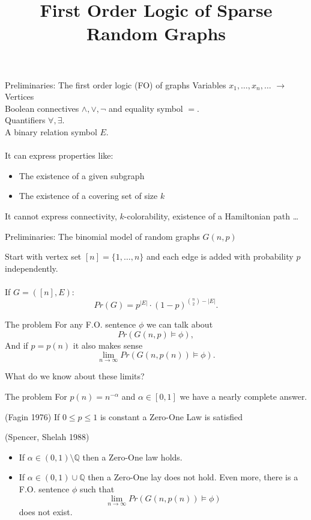 \documentclass[handout, 11pt]{beamer}
\title[First Order Logic of Sparse Random Graphs]{First Order
Logic of Sparse Random Graphs}
\newcommand{\Ln}{\lim\limits_{n\to \infty}}
\begin{document}
	\frame{\titlepage}

\begin{frame}{Preliminaries: The first order logic (FO) of graphs}
	Variables $x_1, \dots, x_n, \dots$ $\rightarrow$ Vertices\\
	Boolean connectives $\wedge, \vee, \neg$ and equality symbol $=$.\\
	Quantifiers $\forall, \exists$.\\
	A binary relation symbol $E$.\\~\\
	It can express properties like:
	\begin{itemize}
		\item The existence of a given subgraph
		\item The existence of a covering set of size $k$
	\end{itemize}
	It cannot express connectivity, $k$-colorability, existence of a Hamiltonian
	path \dots
\end{frame}

\begin{frame}{Preliminaries: The binomial model of random graphs $G(n,p)$}

	Start with vertex set $[n]=\{1,\dots, n\}$ and
	each edge is added with probability $p$ independently. 
	\\~\\
	If $G=([n], E)$:
	\[ Pr(G)= p^{|E|}\cdot (1-p)^{\binom{n}{2}- |E|}. \]
	
\end{frame}

\begin{frame}{The problem}
For any F.O. sentence $\phi$ we can talk about
\[ Pr(G(n,p)\models \phi ), \]
And if $p=p(n)$ it also makes sense
\[ \Ln Pr(G(n,p(n))\models \phi) .\] 

What do we know about these limits?

\end{frame} 

\begin{frame}{The problem}	
For $p(n)=n^{-\alpha}$ and $\alpha\in [0,1]$ we have a nearly complete answer.
\begin{theorem}{(Fagin 1976)} If $0\leq p \leq 1$ is constant a Zero-One Law is satisfied
\end{theorem}
\begin{theorem}{(Spencer, Shelah 1988)} 
	\begin{itemize}
		\item If $\alpha \in (0,1)\setminus \mathbb{Q}$ then
		a Zero-One law holds.
		\item If $\alpha \in (0,1)\cup \mathbb{Q}$ then a Zero-One
		lay does not hold. Even more, there is a F.O. sentence
		$\phi$ such that
		\[ \Ln Pr(G(n,p(n))\models \phi) \]   
		does not exist.
	\end{itemize}
\end{theorem}

\end{frame}
\end{document}
